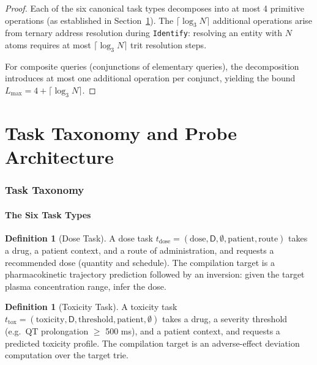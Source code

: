 \documentclass[11pt,twocolumn,a4paper]{article}
\theoremstyle{definition}
\newtheorem{definition}[theorem]{Definition}
\theoremstyle{remark}
\begin{document}
\begin{proof}
Each of the six canonical task types decomposes into at most 4 primitive operations (as established in Section~\ref{sec:task_taxonomy}). The $\lceil \log_3 N \rceil$ additional operations arise from ternary address resolution during \texttt{Identify}: resolving an entity with $N$ atoms requires at most $\lceil \log_3 N \rceil$ trit resolution steps.

For composite queries (conjunctions of elementary queries), the decomposition introduces at most one additional operation per conjunct, yielding the bound $L_{\max} = 4 + \lceil \log_3 N \rceil$.
\end{proof}

\part{Task Taxonomy and Probe Architecture}

\section{Task Taxonomy}
\label{sec:task_taxonomy}

\subsection{The Six Task Types}

\begin{definition}[Dose Task]
\label{def:dose_task}
A dose task $t_{\mathrm{dose}} = (\mathrm{dose}, \mathsf{D}, \emptyset, \mathrm{patient}, \mathrm{route})$ takes a drug, a patient context, and a route of administration, and requests a recommended dose (quantity and schedule). The compilation target is a pharmacokinetic trajectory prediction followed by an inversion: given the target plasma concentration range, infer the dose.
\end{definition}

\begin{definition}[Toxicity Task]
\label{def:toxicity_task}
A toxicity task $t_{\mathrm{tox}} = (\mathrm{toxicity}, \mathsf{D}, \mathrm{threshold}, \mathrm{patient}, \emptyset)$ takes a drug, a severity threshold (e.g.\ QT prolongation $\geq$ 500 ms), and a patient context, and requests a predicted toxicity profile. The compilation target is an adverse-effect deviation computation over the target trie.
\end{definition}
\end{document}
